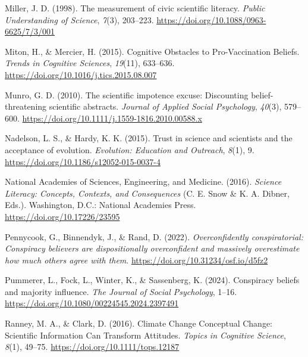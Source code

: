 \documentclass[
  doc,floatsintext]{apa6}
\newlength{\cslhangindent}
\newenvironment{CSLReferences}[2] %
 {\begin{list}{}{%
  \setlength{\itemindent}{0pt}
  \setlength{\leftmargin}{0pt}
  \setlength{\parsep}{0pt}
  \ifodd #1
   \setlength{\leftmargin}{\cslhangindent}
   \setlength{\itemindent}{-1\cslhangindent}
  \fi
  \setlength{\itemsep}{#2\baselineskip}}}
 {\end{list}}
\begin{document}
\begin{CSLReferences}{1}{0}
Miller, J. D. (1998). The measurement of civic scientific literacy. \emph{Public Understanding of Science}, \emph{7}(3), 203--223. \url{https://doi.org/10.1088/0963-6625/7/3/001}

Miton, H., \& Mercier, H. (2015). Cognitive Obstacles to Pro-Vaccination Beliefs. \emph{Trends in Cognitive Sciences}, \emph{19}(11), 633--636. \url{https://doi.org/10.1016/j.tics.2015.08.007}

Munro, G. D. (2010). The scientific impotence excuse: Discounting belief-threatening scientific abstracts. \emph{Journal of Applied Social Psychology}, \emph{40}(3), 579--600. \url{https://doi.org/10.1111/j.1559-1816.2010.00588.x}

Nadelson, L. S., \& Hardy, K. K. (2015). Trust in science and scientists and the acceptance of evolution. \emph{Evolution: Education and Outreach}, \emph{8}(1), 9. \url{https://doi.org/10.1186/s12052-015-0037-4}

National Academies of Sciences, Engineering, and Medicine. (2016). \emph{Science Literacy: Concepts, Contexts, and Consequences} (C. E. Snow \& K. A. Dibner, Eds.). Washington, D.C.: National Academies Press. \url{https://doi.org/10.17226/23595}

Pennycook, G., Binnendyk, J., \& Rand, D. (2022). \emph{Overconfidently conspiratorial: Conspiracy believers are dispositionally overconfident and massively overestimate how much others agree with them}. \url{https://doi.org/10.31234/osf.io/d5fz2}

Pummerer, L., Fock, L., Winter, K., \& Sassenberg, K. (2024). Conspiracy beliefs and majority influence. \emph{The Journal of Social Psychology}, 1--16. \url{https://doi.org/10.1080/00224545.2024.2397491}

Ranney, M. A., \& Clark, D. (2016). Climate Change Conceptual Change: Scientific Information Can Transform Attitudes. \emph{Topics in Cognitive Science}, \emph{8}(1), 49--75. \url{https://doi.org/10.1111/tops.12187}


\end{CSLReferences}
\end{document}
